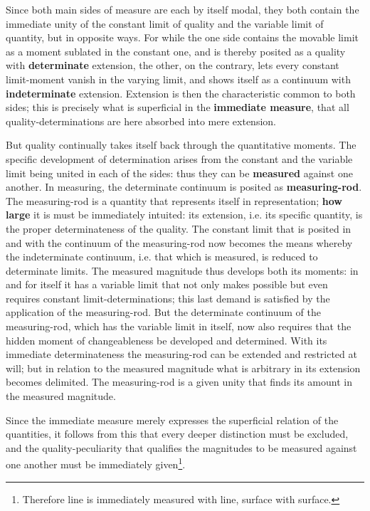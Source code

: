 \documentclass[12pt,a4paper,openany]{book}
\newcommand{\opage}[1]{\marginnote{\footnotesize\textit{[#1]}}}
\begin{document}
Since both main sides of measure are each by itself modal, they both contain the immediate unity of the constant limit of quality and the variable limit of quantity, but in opposite ways. For while the one side contains the movable limit as a moment sublated in the constant one, and is thereby posited as a quality with \textbf{determinate} extension, the other, on the contrary, lets every constant limit-moment vanish in the varying limit, and shows itself as a continuum with \textbf{indeterminate} extension. Extension is then the characteristic common to both sides; this is precisely what is superficial in the \textbf{immediate measure}, that all quality-determinations are here absorbed into mere extension.

But quality continually takes itself back through the quantitative moments. The specific development of determination arises from the constant and the variable limit being united in each of the sides: thus they can be \textbf{measured} against one another. In measuring, the determinate continuum is posited as \textbf{measuring-rod}. The measuring-rod is a quantity that represents itself in representation; \textbf{how large} it is must be immediately intuited: its extension, i.e. its specific quantity, is the proper determinateness of the quality. The constant
\setcounter{footnote}{0}%
\opage{61}limit that is posited in and with the continuum of the measuring-rod now becomes the means whereby the indeterminate continuum, i.e. that which is measured, is reduced to determinate limits. The measured magnitude thus develops both its moments: in and for itself it has a variable limit that not only makes possible but even requires constant limit-determinations; this last demand is satisfied by the application of the measuring-rod. But the determinate continuum of the measuring-rod, which has the variable limit in itself, now also requires that the hidden moment of changeableness be developed and determined. With its immediate determinateness the measuring-rod can be extended and restricted at will; but in relation to the measured magnitude what is arbitrary in its extension becomes delimited. The measuring-rod is a given unity that finds its amount in the measured magnitude.

Since the immediate measure merely expresses the superficial relation of the quantities, it follows from this that every deeper distinction must be excluded, and the quality-peculiarity that qualifies the magnitudes to be measured against one another must be immediately given\footnote{Therefore line is immediately measured with line, surface with surface.}.
\end{document}

